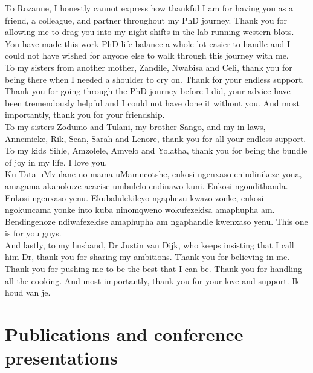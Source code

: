 \noindent
To Rozanne, I honestly cannot express how thankful I am for having you as a friend, a colleague, and partner throughout my PhD journey. Thank you for allowing me to drag you into my night shifts in the lab running western blots. You have made this work-PhD life balance a whole lot easier to handle and I could not have wished for anyone else to walk through this journey with me.\\

\noindent
To my sisters from another mother, Zandile, Nwabisa and Celi, thank you for being there when I needed a shoulder to cry on. Thank for your endless support. Thank you for going through the PhD journey before I did, your advice have been tremendously helpful and I could not have done it without you. And most importantly, thank you for your friendship.\\

\noindent
To my sisters Zodumo and Tulani, my brother Sango, and my in-laws, Annemieke, Rik, Sean, Sarah and Lenore, thank you for all your endless support.\\

\noindent
To my kids Sihle, Amzolele, Amvelo and Yolatha, thank you for being the bundle of  joy in my life. I love you.\\

\noindent
Ku Tata uMvulane no mama uMamncotshe, enkosi ngenxaso enindinikeze yona, amagama akanokuze acacise umbulelo endinawo kuni. Enkosi ngondithanda. Enkosi ngenxaso yenu. Ekubalulekileyo ngaphezu kwazo zonke, enkosi ngokuncama yonke into kuba ninomqweno wokufezekisa amaphupha am. Bendingenoze ndiwafezekise amaphupha am ngaphandle kwenxaso yenu. This one is for you guys.\\

\noindent
And lastly, to my husband, Dr Justin van Dijk, who keeps insisting that I call him Dr, thank you for sharing my ambitions. Thank you for believing in me. Thank you for pushing me to be the best that I can be. Thank you for handling all the cooking. And most importantly, thank you for your love and support. Ik houd van je.

\chapter{Publications and conference presentations}

